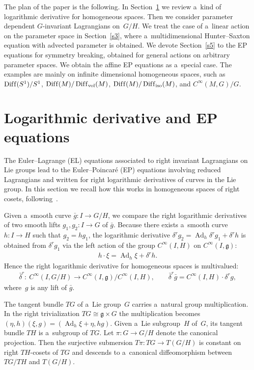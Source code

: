 \documentclass[pdftex]{sigma}
\numberwithin{equation}{section}
\begin{document}
The plan of the paper is the following.
In Section~\ref{s2} we review a~kind of logarithmic derivative for homogeneous spaces.
Then we consider parameter dependent $G$-invariant Lagrangians on~$G/H$.
We treat the case of a~linear action on the parameter space in Section~\ref{s3}, where a~multidimensional Hunter--Saxton
equation with advected parameter is obtained.
We devote Section~\ref{s5} to the EP equations for symmetry breaking, obtained for general actions on arbitrary
parameter spaces.
We obtain the af\/f\/ine EP equations as a~special case.
The examples are mainly on inf\/inite dimensional homogeneous spaces, such as $\operatorname{Dif\/f}(S^1)/S^1$,
$\operatorname{Dif\/f}(M)/\operatorname{Dif\/f}_{\operatorname{vol}}(M)$,
$\operatorname{Dif\/f}(M)/\operatorname{Dif\/f}_{\operatorname{iso}}(M)$, and $C^{\infty}(M,G)/G$.

\section{Logarithmic derivative and EP equations}
\label{s2}

The Euler--Lagrange (EL) equations associated to right invariant Lagrangians on Lie groups lead to the Euler--Poincar\'e
(EP) equations involving reduced Lagrangians and written for right logarithmic derivatives of curves in the Lie group.
In this section we recall how this works in homogeneous spaces of right cosets, following~\cite{TV}.

Given a~smooth curve $\bar g:I\to G/H$, we compare the right logarithmic derivatives of two smooth lifts $g_1,g_2:I\to
G$ of $\bar g$.
Because there exists a~smooth curve $h:I\to H$ such that $g_2=hg_1$, the logarithmic derivative $\delta^r
g_2=\operatorname{Ad}_h\delta^rg_1+\delta^rh$ is obtained from $\delta^r g_1$ via the left action of the group
$C^{\infty}(I,H)$ on $C^{\infty}(I,\mathfrak g)$:
\begin{gather}
\label{leftaction}
h\cdot \xi=\operatorname{Ad}_h\xi+\delta^rh.
\end{gather}
Hence the right logarithmic derivative for homogeneous spaces is multivalued:
\begin{gather}
\label{logderhom}
\bar\delta^r: \ C^{\infty}(I,G/H)\to C^{\infty}(I,\mathfrak g)/C^{\infty}(I,H),
\qquad
\bar\delta^r\bar g=C^{\infty}(I,H)\cdot\delta^r g,
\end{gather}
where~$g$ is any lift of $\bar g$.

The tangent bundle $TG$ of a~Lie group~$G$ carries a~natural group multiplication.
In the right trivialization $TG\cong \mathfrak g\times G$ the multiplication becomes
$(\eta,h)(\xi,g)=(\operatorname{Ad}_h\xi+\eta,hg)$.
Given a~Lie subgroup~$H$ of~$G$, its tangent bundle $TH$ is a~subgroup of $TG$.
Let $\pi:G\to G/H$ denote the canonical projection.
Then the   surjective submersion $T\pi:TG\to T(G/H)$ is constant on right $TH$-cosets of $TG$ and descends to
a~canonical dif\/feomorphism between $TG/TH$ and $T(G/H)$.
\end{document}
